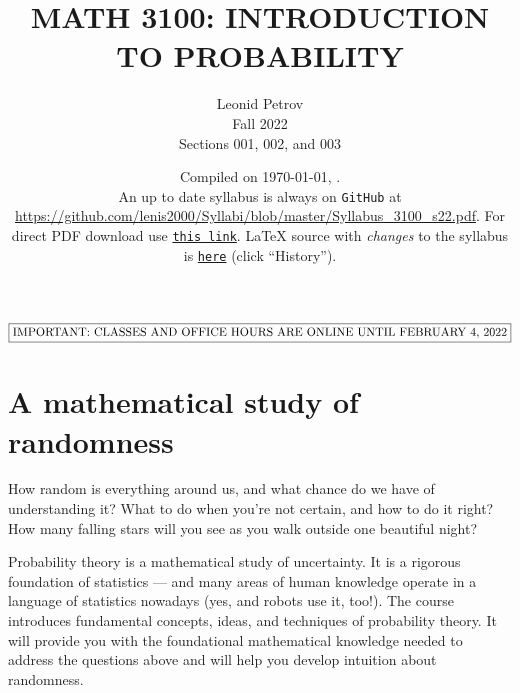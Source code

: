 \documentclass[oneside,11pt]{amsart}
\begin{document}
\title[MATH 3100: INTRODUCTION TO PROBABILITY]{MATH 3100: INTRODUCTION TO PROBABILITY}
\author{Leonid Petrov\\Fall 2022\\Sections 001, 002, and 003}
\date{Compiled on \today, \currenttime.\\An up to date syllabus is always on \texttt{GitHub} at \url{https://github.com/lenis2000/Syllabi/blob/master/Syllabus_3100_s22.pdf}. For direct PDF download use \href{https://github.com/lenis2000/Syllabi/raw/master/Syllabus_3100_s22.pdf}{\texttt{this link}}.
	\LaTeX{} source with \textit{changes} to the syllabus is \href{https://github.com/lenis2000/Syllabi/blob/master/Syllabus_3100_s22.tex}{\texttt{here}}
(click ``History'').}
\maketitle

\bigskip

$\boxed{\textnormal{IMPORTANT: CLASSES AND OFFICE HOURS ARE ONLINE UNTIL FEBRUARY 4, 2022}}$


\section{A mathematical study of randomness}

How random is everything around us, and what chance do we have of understanding it? What to do when you're not certain, and how to do it right? How many falling stars will you see as you walk outside one beautiful night? 

Probability theory is a mathematical study of uncertainty. It is a rigorous foundation of statistics --- and many areas of human knowledge operate in a language of statistics nowadays (yes, and robots use it, too!). The course introduces fundamental concepts, ideas, and techniques of probability theory. It will provide you with the foundational mathematical knowledge needed to address the questions above and will help you develop intuition about randomness.
\end{document}
